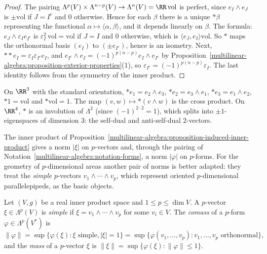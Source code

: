 \begin{proof}
The pairing $\Lambda^p(V) \times \Lambda^{n-p}(V) \to \Lambda^n(V) = \RR\,\mathrm{vol}$ is perfect, since $e_I \wedge e_J$ is
$\pm\mathrm{vol}$ if $J = I^c$ and $0$ otherwise. Hence for each $\beta$ there is a unique $*\beta$ representing the functional
$\alpha \mapsto \langle \alpha, \beta \rangle$, and it depends linearly on $\beta$. The formula: $e_J \wedge \varepsilon_I e_{I^c}$ is
$\varepsilon_I^2\,\mathrm{vol} = \mathrm{vol}$ if $J = I$ and $0$ otherwise, which is $\langle e_J, e_I \rangle\mathrm{vol}$. So $*$ maps the
orthonormal basis $(e_I)$ to $(\pm e_{I^c})$, hence is an isometry. Next,
$**e_I = \varepsilon_I\varepsilon_{I^c}e_I$, and $e_{I^c} \wedge e_I = (-1)^{p(n-p)}e_I \wedge e_{I^c}$ by
Proposition~\ref{multilinear-algebra:proposition-exterior-properties}(1), so
$\varepsilon_{I^c} = (-1)^{p(n-p)}\varepsilon_I$. The last identity follows from the symmetry of the inner product.
\end{proof}

\begin{example}\label{multilinear-algebra:example-star-r3}
On $\RR^3$ with the standard orientation, $*e_1 = e_2 \wedge e_3$, $*e_2 = e_3 \wedge e_1$, $*e_3 = e_1 \wedge e_2$,
$*1 = \mathrm{vol}$ and $*\mathrm{vol} = 1$. The map $(v, w) \mapsto *(v \wedge w)$ is the cross product. On $\RR^4$, $*$ is an
involution of $\Lambda^2$ (since $(-1)^{2 \cdot 2} = 1$), which splits into $\pm 1$-eigenspaces of dimension $3$: the self-dual
and anti-self-dual $2$-vectors.
\end{example}

The inner product of Proposition~\ref{multilinear-algebra:proposition-induced-inner-product} gives a norm $|\xi|$ on $p$-vectors and, through the pairing of Notation~\ref{multilinear-algebra:notation-forms}, a norm $|\varphi|$ on
$p$-forms. For the geometry of $p$-dimensional areas another pair of norms is better adapted: they treat the \emph{simple} $p$-vectors $v_1 \wedge \cdots \wedge v_p$, which represent oriented $p$-dimensional
parallelepipeds, as the basic objects.

\begin{definition}\label{multilinear-algebra:definition-comass}
Let $(V, g)$ be a real inner product space and $1 \leq p \leq \dim V$. A $p$-vector $\xi \in \Lambda^p(V)$ is \emph{simple} if $\xi = v_1 \wedge \cdots \wedge v_p$ for some $v_i \in V$. The \emph{comass} of a $p$-form
$\varphi \in \Lambda^p(V^*)$ is
\[
\|\varphi\| = \sup\{\varphi(\xi) : \xi \text{ simple}, |\xi| = 1\} = \sup\{\varphi(v_1, \ldots, v_p) : v_1, \ldots, v_p \text{ orthonormal}\},
\]
and the \emph{mass} of a $p$-vector $\xi$ is $\|\xi\| = \sup\{\varphi(\xi) : \|\varphi\| \leq 1\}$.
\end{definition}

